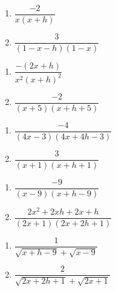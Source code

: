 \documentclass{ximera}
\begin{document}
\begin{multicols}{2}
\begin{enumerate}
\setcounter{enumi}{\value{HW}}

\item $\dfrac{-2}{x(x+h)}$
\item $\dfrac{3}{(1-x-h)(1-x)}$

\setcounter{HW}{\value{enumi}}
\end{enumerate}
\end{multicols}

\begin{multicols}{2}
\begin{enumerate}
\setcounter{enumi}{\value{HW}}

\item  $\dfrac{-(2x+h)}{x^2(x+h)^2}$
\item  $\dfrac{-2}{(x+5)(x+h+5)}$

\setcounter{HW}{\value{enumi}}
\end{enumerate}
\end{multicols}

\begin{multicols}{2}
\begin{enumerate}
\setcounter{enumi}{\value{HW}}

\item $\dfrac{-4}{(4x-3)(4x+4h-3)}$
\item $\dfrac{3}{(x+1)(x+h+1)}$

\setcounter{HW}{\value{enumi}}
\end{enumerate}
\end{multicols}

\begin{multicols}{2}
\begin{enumerate}
\setcounter{enumi}{\value{HW}}

\item $\dfrac{-9}{(x - 9)(x + h - 9)}$
\item $\dfrac{2x^2+2xh+2x+h}{(2x+1)(2x+2h+1)}$

\setcounter{HW}{\value{enumi}}
\end{enumerate}
\end{multicols}

\begin{multicols}{2}
\begin{enumerate}
\setcounter{enumi}{\value{HW}}

\item  $\dfrac{1}{\sqrt{x+h-9} + \sqrt{x-9}}$
\item $\dfrac{2}{\sqrt{2x+2h+1} + \sqrt{2x+1}}$

\setcounter{HW}{\value{enumi}}
\end{enumerate}
\end{multicols}
\end{document}
